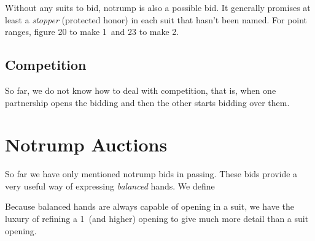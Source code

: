 \documentclass[oneside]{memoir}
\begin{document}
Without any suits to bid, notrump is also a possible bid.  It
generally promises at least a \textit{stopper} (protected honor) in
each suit that hasn't been named.  For point ranges, figure 20 to make 
1\NT\ and 23 to make 2\NT.

\section{Competition}
So far, we do not know how to deal with competition, that is, when one
partnership opens the bidding and then the other starts bidding over them.

\chapter{Notrump Auctions}
So far we have only mentioned notrump bids in passing.    These bids provide
a very useful way of expressing \textit{balanced} hands.  We define

Because balanced hands are always capable of opening in a suit, we have the
luxury of refining a 1\NT\ (and higher) opening to give much more detail
than a suit opening.





\end{document}
